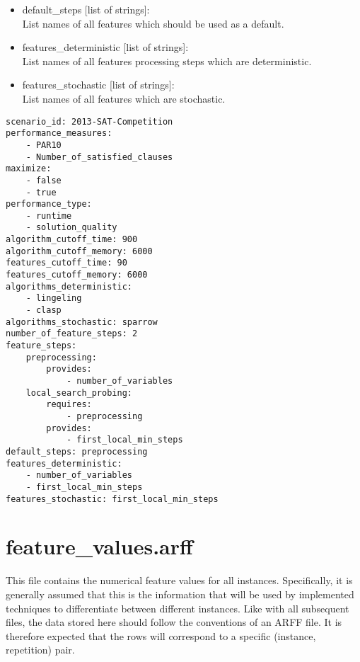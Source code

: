 \begin{itemize}
  	      		$\-\hspace{2cm}$ provides:\\
  	      		$\-\hspace{3cm}$ - feature3\\
              	You are free to use any step names you like, 
              	as long as they are unique and do not contain illegal characters.
    \item default\_steps [list of strings]:\\
    	  List names of all features which should be used as a default.
    \item features\_deterministic [list of strings]:\\
    	  List names of all features processing steps which are deterministic.
    \item features\_stochastic [list of strings]:\\
          List names of all features which are stochastic. 
\end{itemize}

\begin{lstlisting}[caption=Example description.txt]
scenario_id: 2013-SAT-Competition
performance_measures:
    - PAR10
    - Number_of_satisfied_clauses
maximize:
    - false
    - true
performance_type: 
    - runtime
    - solution_quality
algorithm_cutoff_time: 900
algorithm_cutoff_memory: 6000
features_cutoff_time: 90
features_cutoff_memory: 6000
algorithms_deterministic:
    - lingeling
    - clasp
algorithms_stochastic: sparrow
number_of_feature_steps: 2
feature_steps:
    preprocessing:
        provides: 
            - number_of_variables
    local_search_probing:
        requires:
            - preprocessing
        provides:
            - first_local_min_steps
default_steps: preprocessing
features_deterministic:
    - number_of_variables
    - first_local_min_steps
features_stochastic: first_local_min_steps
\end{lstlisting}

\section{feature\_values.arff}

This file contains the numerical feature values for all instances. Specifically, it is generally assumed that this is the
information that will be used by implemented techniques to differentiate between different instances. Like with all
subsequent files, the data stored here should follow the conventions of an ARFF file. It is therefore expected that the
rows will correspond to a specific (instance, repetition) pair.


